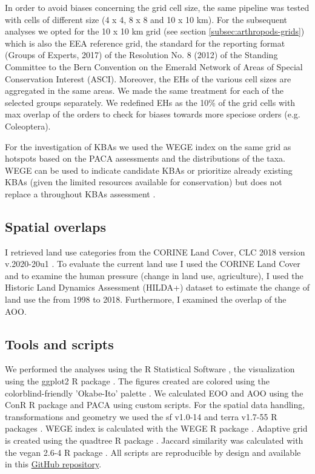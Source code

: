 In order to avoid biases concerning the grid cell size, the same
pipeline was tested with cells of different size (4 x 4, 8 x 8 and 10 x 10 km).
For the subsequent analyses we opted for the 10 x 10 km grid (see section \ref{subsec:arthropods-grids})
which is also the EEA reference grid, the standard for the reporting format
(Groups of Experts, 2017) of the Resolution No. 8 (2012) of the Standing Committee
to the Bern Convention on the Emerald Network of Areas of Special Conservation Interest (ASCI).
Moreover, the EHs of the various cell sizes are aggregated in the same areas.
We made the same treatment for each of the selected groups separately.
We redefined EHs as the 10\% of the grid cells with max overlap of the orders
to check for biases towards more speciose orders (e.g. Coleoptera).

For the investigation of KBAs \parencite{iucn2016} we used the WEGE index \parencite{farooq2020wege}
on the same grid as hotspots based on the PACA assessments and the distributions
of the taxa. WEGE can be used to indicate candidate KBAs or prioritize already
existing KBAs (given the limited resources available for conservation) but does
not replace a throughout KBAs assessment \parencite{farooq2020wege}.

    \subsection{Spatial overlaps}
    \label{subsec:arthropods-spatial}
I retrieved land use categories from the CORINE Land Cover, CLC 2018 version
v.2020-20u1 \parencite{CLC2023}.
To evaluate the current land use I used the CORINE Land Cover
and to examine the human pressure (change in land use, agriculture), I used the
Historic Land Dynamics Assessment (HILDA+) dataset \parencite{winkler2021global} to
estimate the change of land use the from 1998 to 2018. Furthermore, I examined
the overlap of the AOO.


    \subsection{Tools and scripts}
    \label{subsec:arthropods-tools}
We performed the analyses using the R Statistical Software \parencite{rcoreteam},
the visualization using the ggplot2 R package \parencite{wickham_ggplot2_2016}. The figures
created are colored using the colorblind-friendly 'Okabe-Ito' palette \parencite{ichihara2008color}.
We calculated EOO and AOO using the ConR R package \parencite{dauby2017conr:} and PACA
using custom scripts. For the spatial data handling, transformations and
geometry we used the sf v1.0-14 \parencite{pebesma2018simple} and terra v1.7-55 R packages \parencite{hijmans2024terra}.
WEGE index is calculated with the WEGE R package \parencite{farooq2020wege}.
Adaptive grid is created using the quadtree R package \parencite{friend2023quadtree}.
Jaccard similarity was calculated with the vegan 2.6-4 R package \parencite{oksanen2024vegan}.
All scripts are reproducible by design and available in this 
\href{https://github.com/savvas-paragkamian/arthropoda_assessment_crete}{GitHub repository}.


